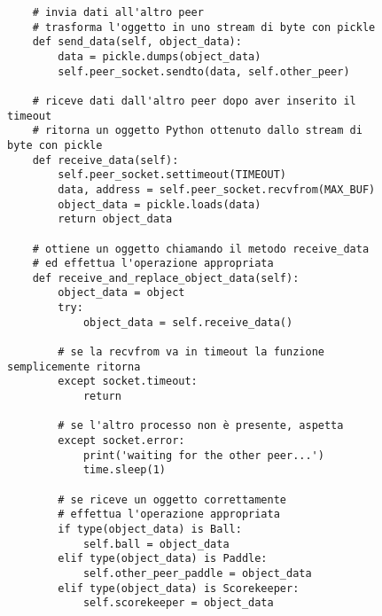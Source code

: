 \begin{figure}
    \begin{verbatim}
    # invia dati all'altro peer
    # trasforma l'oggetto in uno stream di byte con pickle
    def send_data(self, object_data):
        data = pickle.dumps(object_data)
        self.peer_socket.sendto(data, self.other_peer)

    # riceve dati dall'altro peer dopo aver inserito il timeout
    # ritorna un oggetto Python ottenuto dallo stream di byte con pickle
    def receive_data(self):
        self.peer_socket.settimeout(TIMEOUT)
        data, address = self.peer_socket.recvfrom(MAX_BUF)
        object_data = pickle.loads(data)
        return object_data

    # ottiene un oggetto chiamando il metodo receive_data
    # ed effettua l'operazione appropriata
    def receive_and_replace_object_data(self):
        object_data = object
        try:
            object_data = self.receive_data()

        # se la recvfrom va in timeout la funzione semplicemente ritorna
        except socket.timeout:
            return

        # se l'altro processo non è presente, aspetta
        except socket.error:
            print('waiting for the other peer...')
            time.sleep(1)

        # se riceve un oggetto correttamente
        # effettua l'operazione appropriata
        if type(object_data) is Ball:
            self.ball = object_data
        elif type(object_data) is Paddle:
            self.other_peer_paddle = object_data
        elif type(object_data) is Scorekeeper:
            self.scorekeeper = object_data
    \end{verbatim}
    \label{fig:peer2}
\end{figure}

